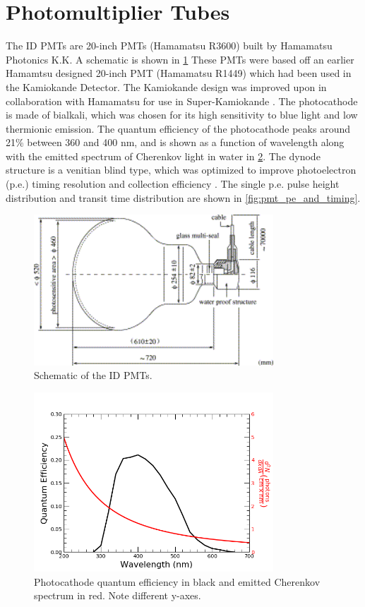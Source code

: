 \section{Photomultiplier Tubes}
\label{sec:pmts}
The ID PMTs are 20-inch PMTs (Hamamatsu R3600) built by Hamamatsu Photonics K.K.  A schematic is shown in \cref{fig:pmt}  These PMTs were based off an earlier Hamamtsu designed 20-inch PMT (Hamamatsu R1449) which had been used in the Kamiokande Detector.  The Kamiokande design was improved upon in collaboration with Hamamatsu for use in Super-Kamiokande \cite{Suzuki:1992as}.  The photocathode is made of bialkali, which was chosen for its high sensitivity to blue light and low thermionic emission.  The quantum efficiency of the photocathode peaks around 21\% between 360 and 400 nm, and is shown as a function of wavelength along with the emitted spectrum of Cherenkov light in water in \cref{fig:pmt_qe_cherenkov_spectrum}. The dynode structure is a venitian blind type, which was optimized to improve photoelectron (p.e.) timing resolution and collection efficiency \cite{Suzuki:1992as}.  The single p.e. pulse height distribution and transit time distribution are shown in \cref{fig:pmt_pe_and_timing}.\par    

\begin{figure}
\centering
\includegraphics[width=0.8\textwidth]{figures/pmt.png}
\caption{Schematic of the ID PMTs. \cite{Fukuda:2002uc}}
\label{fig:pmt}
\end{figure}

\begin{figure}
\centering
\includegraphics[width=0.8\textwidth]{figures/pmt_qe_cherenkov_spectrum.png}
\caption{Photocathode quantum efficiency in black and emitted Cherenkov spectrum in red.  Note different y-axes.}
\label{fig:pmt_qe_cherenkov_spectrum}
\end{figure}

